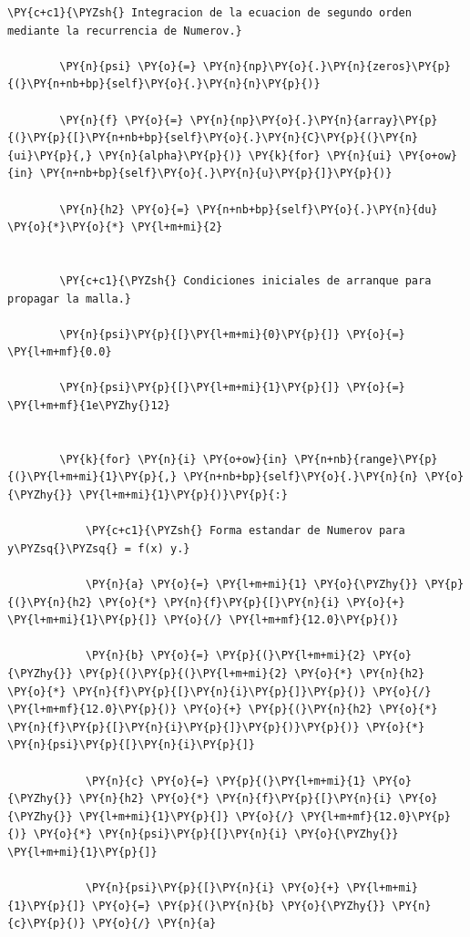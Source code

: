 \documentclass[11pt]{article}
\makeatletter
\def\PY@reset{\let\PY@it=\relax \let\PY@bf=\relax \let\PY@ul=\relax \let\PY@tc=\relax \let\PY@bc=\relax \let\PY@ff=\relax}
\def\PY@tok#1{\csname PY@tok@#1\endcsname}
\def\PY@toks#1+{\ifx\relax#1\empty\else \PY@tok{#1}\expandafter\PY@toks\fi}
\def\PY@do#1{\PY@bc{\PY@tc{\PY@ul{\PY@it{\PY@bf{\PY@ff{#1}}}}}}}
\def\PY#1#2{\PY@reset\PY@toks#1+\relax+\PY@do{#2}}
\makeatother
\begin{document}
\begin{tcolorbox}[breakable, size=fbox, boxrule=1pt, pad at break*=1mm,colback=cellbackground, colframe=cellborder]
\begin{Verbatim}[commandchars=\\\{\}]
        \PY{c+c1}{\PYZsh{} Integracion de la ecuacion de segundo orden mediante la recurrencia de Numerov.}

        \PY{n}{psi} \PY{o}{=} \PY{n}{np}\PY{o}{.}\PY{n}{zeros}\PY{p}{(}\PY{n+nb+bp}{self}\PY{o}{.}\PY{n}{n}\PY{p}{)}

        \PY{n}{f} \PY{o}{=} \PY{n}{np}\PY{o}{.}\PY{n}{array}\PY{p}{(}\PY{p}{[}\PY{n+nb+bp}{self}\PY{o}{.}\PY{n}{C}\PY{p}{(}\PY{n}{ui}\PY{p}{,} \PY{n}{alpha}\PY{p}{)} \PY{k}{for} \PY{n}{ui} \PY{o+ow}{in} \PY{n+nb+bp}{self}\PY{o}{.}\PY{n}{u}\PY{p}{]}\PY{p}{)}

        \PY{n}{h2} \PY{o}{=} \PY{n+nb+bp}{self}\PY{o}{.}\PY{n}{du} \PY{o}{*}\PY{o}{*} \PY{l+m+mi}{2}


        \PY{c+c1}{\PYZsh{} Condiciones iniciales de arranque para propagar la malla.}

        \PY{n}{psi}\PY{p}{[}\PY{l+m+mi}{0}\PY{p}{]} \PY{o}{=} \PY{l+m+mf}{0.0}

        \PY{n}{psi}\PY{p}{[}\PY{l+m+mi}{1}\PY{p}{]} \PY{o}{=} \PY{l+m+mf}{1e\PYZhy{}12}


        \PY{k}{for} \PY{n}{i} \PY{o+ow}{in} \PY{n+nb}{range}\PY{p}{(}\PY{l+m+mi}{1}\PY{p}{,} \PY{n+nb+bp}{self}\PY{o}{.}\PY{n}{n} \PY{o}{\PYZhy{}} \PY{l+m+mi}{1}\PY{p}{)}\PY{p}{:}

            \PY{c+c1}{\PYZsh{} Forma estandar de Numerov para y\PYZsq{}\PYZsq{} = f(x) y.}

            \PY{n}{a} \PY{o}{=} \PY{l+m+mi}{1} \PY{o}{\PYZhy{}} \PY{p}{(}\PY{n}{h2} \PY{o}{*} \PY{n}{f}\PY{p}{[}\PY{n}{i} \PY{o}{+} \PY{l+m+mi}{1}\PY{p}{]} \PY{o}{/} \PY{l+m+mf}{12.0}\PY{p}{)}

            \PY{n}{b} \PY{o}{=} \PY{p}{(}\PY{l+m+mi}{2} \PY{o}{\PYZhy{}} \PY{p}{(}\PY{p}{(}\PY{l+m+mi}{2} \PY{o}{*} \PY{n}{h2} \PY{o}{*} \PY{n}{f}\PY{p}{[}\PY{n}{i}\PY{p}{]}\PY{p}{)} \PY{o}{/} \PY{l+m+mf}{12.0}\PY{p}{)} \PY{o}{+} \PY{p}{(}\PY{n}{h2} \PY{o}{*} \PY{n}{f}\PY{p}{[}\PY{n}{i}\PY{p}{]}\PY{p}{)}\PY{p}{)} \PY{o}{*} \PY{n}{psi}\PY{p}{[}\PY{n}{i}\PY{p}{]}

            \PY{n}{c} \PY{o}{=} \PY{p}{(}\PY{l+m+mi}{1} \PY{o}{\PYZhy{}} \PY{n}{h2} \PY{o}{*} \PY{n}{f}\PY{p}{[}\PY{n}{i} \PY{o}{\PYZhy{}} \PY{l+m+mi}{1}\PY{p}{]} \PY{o}{/} \PY{l+m+mf}{12.0}\PY{p}{)} \PY{o}{*} \PY{n}{psi}\PY{p}{[}\PY{n}{i} \PY{o}{\PYZhy{}} \PY{l+m+mi}{1}\PY{p}{]}

            \PY{n}{psi}\PY{p}{[}\PY{n}{i} \PY{o}{+} \PY{l+m+mi}{1}\PY{p}{]} \PY{o}{=} \PY{p}{(}\PY{n}{b} \PY{o}{\PYZhy{}} \PY{n}{c}\PY{p}{)} \PY{o}{/} \PY{n}{a}



\end{Verbatim}
\end{tcolorbox}
\end{document}
